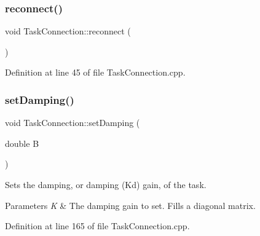 \hypertarget{classocra__recipes_1_1TaskConnection_a416154f1cd736647003442d905b9862e}{}\label{classocra__recipes_1_1TaskConnection_a416154f1cd736647003442d905b9862e} 
\subsubsection{\texorpdfstring{reconnect()}{reconnect()}}
{\footnotesize\ttfamily void Task\+Connection\+::reconnect (\begin{DoxyParamCaption}{ }\end{DoxyParamCaption})}



Definition at line 45 of file Task\+Connection.\+cpp.

\hypertarget{classocra__recipes_1_1TaskConnection_a4f9c4b7b99c41c817b5c9448464b84bc}{}\label{classocra__recipes_1_1TaskConnection_a4f9c4b7b99c41c817b5c9448464b84bc} 
\subsubsection{\texorpdfstring{set\+Damping()}{setDamping()}\hspace{0.1cm}{\footnotesize\ttfamily [1/3]}}
{\footnotesize\ttfamily void Task\+Connection\+::set\+Damping (\begin{DoxyParamCaption}\item[{double}]{B }\end{DoxyParamCaption})}

Sets the damping, or damping (Kd) gain, of the task. 
\begin{DoxyParams}{Parameters}
{\em K} & The damping gain to set. Fills a diagonal matrix. \\
\hline
\end{DoxyParams}


Definition at line 165 of file Task\+Connection.\+cpp.

\hypertarget{classocra__recipes_1_1TaskConnection_ae831590f6b0139cfaff4e54286dc4438}{}\label{classocra__recipes_1_1TaskConnection_ae831590f6b0139cfaff4e54286dc4438} 
